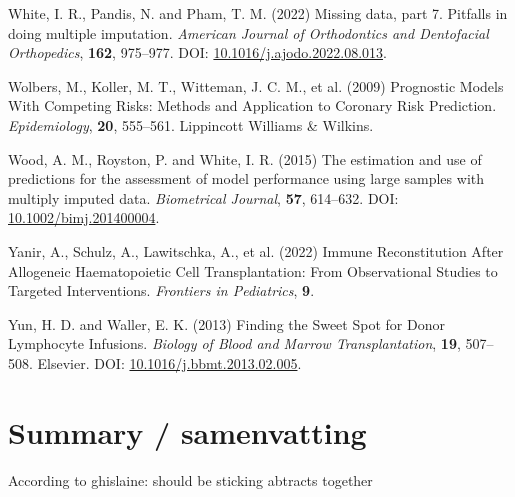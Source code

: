\documentclass[
  letterpaper,
  DIV=11,
  numbers=noendperiod]{scrreprt}
\newlength{\cslhangindent}
\newlength{\cslentryspacingunit} %
\newenvironment{CSLReferences}[2] %
 {%
  \setlength{\parindent}{0pt}
  \ifodd #1
  \let\oldpar\par
  \def\par{\hangindent=\cslhangindent\oldpar}
  \fi
  \setlength{\parskip}{#2\cslentryspacingunit}
 }%
 {}
\begin{document}
\begin{CSLReferences}{1}{0}
\leavevmode{}%
White, I. R., Pandis, N. and Pham, T. M. (2022) Missing data, part 7.
{Pitfalls} in doing multiple imputation. \emph{American Journal of
Orthodontics and Dentofacial Orthopedics}, \textbf{162}, 975--977. DOI:
\href{https://doi.org/10.1016/j.ajodo.2022.08.013}{10.1016/j.ajodo.2022.08.013}.

\leavevmode{}%
Wolbers, M., Koller, M. T., Witteman, J. C. M., et al. (2009) Prognostic
{Models With Competing Risks}: {Methods} and {Application} to {Coronary
Risk Prediction}. \emph{Epidemiology}, \textbf{20}, 555--561. Lippincott
Williams \& Wilkins.

\leavevmode{}%
Wood, A. M., Royston, P. and White, I. R. (2015) The estimation and use
of predictions for the assessment of model performance using large
samples with multiply imputed data. \emph{Biometrical Journal},
\textbf{57}, 614--632. DOI:
\href{https://doi.org/10.1002/bimj.201400004}{10.1002/bimj.201400004}.

\leavevmode{}%
Yanir, A., Schulz, A., Lawitschka, A., et al. (2022) Immune
{Reconstitution After Allogeneic Haematopoietic Cell Transplantation}:
{From Observational Studies} to {Targeted Interventions}.
\emph{Frontiers in Pediatrics}, \textbf{9}.

\leavevmode{}%
Yun, H. D. and Waller, E. K. (2013) Finding the {Sweet Spot} for {Donor
Lymphocyte Infusions}. \emph{Biology of Blood and Marrow
Transplantation}, \textbf{19}, 507--508. Elsevier. DOI:
\href{https://doi.org/10.1016/j.bbmt.2013.02.005}{10.1016/j.bbmt.2013.02.005}.

\end{CSLReferences}


\hypertarget{summary-samenvatting}{%
\chapter*{Summary / samenvatting}\label{summary-samenvatting}}


According to ghislaine: should be sticking abtracts together
\end{document}
